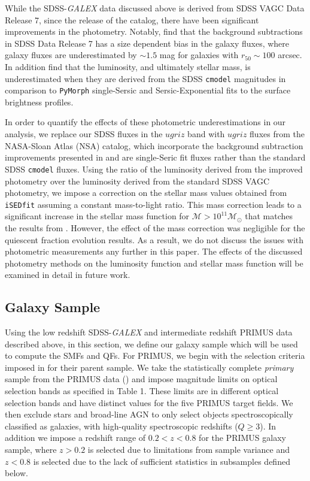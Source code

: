 \documentclass{emulateapj}
\begin{document}
While the SDSS-{\em GALEX} data discussed above is derived from SDSS VAGC Data Release 7, since the release of the catalog, there have been significant improvements in the photometry. Notably, \cite{Blanton:2011aa} find that the background subtractions in SDSS Data Release 7 has a size dependent bias in the galaxy fluxes, where galaxy fluxes are underestimated by $\sim 1.5$ mag for galaxies with $r_{50} \sim 100 $ arcsec. In addition \cite{Bernardi:2013aa} find that the luminosity, and ultimately stellar mass, is underestimated when they are derived from the SDSS \texttt{cmodel} magnitudes in comparison to \texttt{PyMorph} single-Sersic and Sersic-Exponential fits to the surface brightness profiles. 

In order to quantify the effects of these photometric underestimations in our analysis, we replace our SDSS fluxes in the $ugriz$ band with $ugriz$ fluxes from the NASA-Sloan Atlas (NSA) catalog, which incorporate the background subtraction improvements presented in \cite{Blanton:2011aa} and are single-Seric fit fluxes rather than the standard SDSS \texttt{cmodel} fluxes. Using the ratio of the luminosity derived from the improved photometry over the luminosity derived from the standard SDSS VAGC photometry, we impose a correction on the stellar mass values obtained from \texttt{iSEDfit} assuming a constant mass-to-light ratio. This mass correction leads to a significant increase in the stellar mass function for $\mathcal{M} > 10^{11} \mathcal{M}_{\odot}$ that matches the results from \cite{Bernardi:2013aa}. However, the effect of the mass correction was negligible for the quiescent fraction evolution results. As a result, we do not discuss the issues with photometric measurements any further in this paper. The effects of the discussed photometry methods on the luminosity function and stellar mass function will be examined in detail in future work. 

\subsection{Galaxy Sample} \label{sec:target} 
Using the low redshift SDSS-{\em GALEX} and intermediate redshift PRIMUS data described above, in this section, we define our galaxy sample which will be used to compute the SMFs and QFs. For PRIMUS, we begin with the selection criteria imposed in \cite{Moustakas:2013aa} for their parent sample. We take the statistically complete {\em primary} sample from the PRIMUS data (\cite{Coil:2011aa}) and impose magnitude limits on optical selection bands as specified in \cite{Moustakas:2013aa} Table 1. These limits are in different optical selection bands and have distinct values for the five PRIMUS target fields. We then exclude stars and broad-line AGN to only select objects spectroscopically classified as galaxies, with high-quality spectroscopic redshifts ($Q \geq 3$). In addition we impose a redshift range of $ 0.2 < z < 0.8$ for the PRIMUS galaxy sample, where $ z > 0.2$ is selected due to limitations from sample variance and $ z < 0.8$ is selected due to the lack of sufficient statistics in subsamples defined below. 
\end{document}
